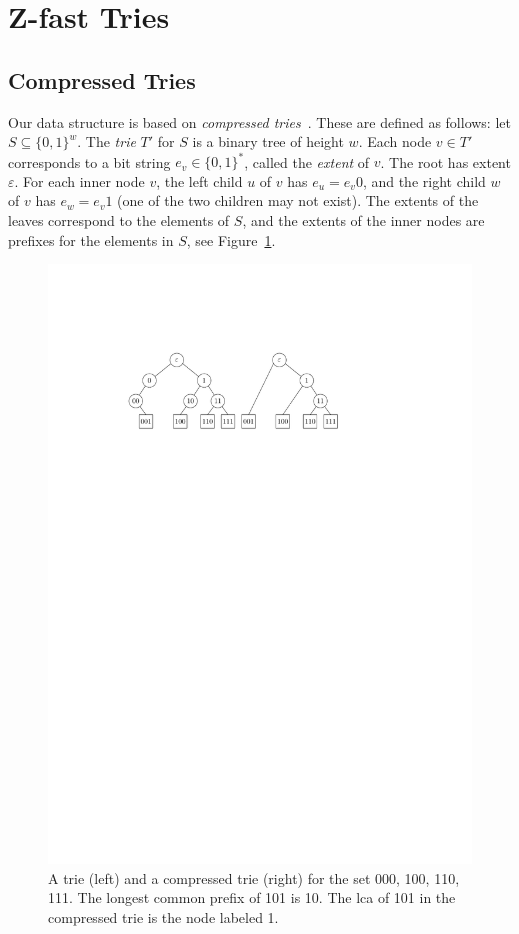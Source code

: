 \documentclass[a4paper,11pt]{article}
\newcommand{\eps}{\varepsilon}
\newcommand{\?}{\mskip1.5mu}
\begin{document}
\section{Z-fast Tries} 

\subsection{Compressed Tries}
Our data structure is based on \emph{compressed
tries}~\cite{CormenLeRiSt09,Knuth98}. These are defined as
follows: let $S \subseteq \{0, 1\}^w$. The \emph{trie} $T'$ for $S$ 
is a binary tree of height $w$. Each node $v \in T'$ corresponds
to a bit string $e_v \in \{0,1\}^*$, called the \emph{extent} of $v$. 
The root has extent $\eps$. For each inner node $v$, the left child 
$u$ of $v$  has $e_u = e_v0$, and the right child $w$ of $v$ has 
$e_w = e_v1$ (one of the two children may not exist). The extents of
the leaves correspond to the elements of $S$, and the extents of the 
inner nodes are prefixes for the elements in $S$, see 
Figure~\ref{fig:trie}.

\begin{figure}
  \centering
  \includegraphics{trie}
  \caption{A trie (left) and a compressed trie (right) for the set 
  000, 100, 110, 111. The longest common prefix of 101 is  10. The 
  lca of 101 in the compressed trie
    is the node labeled 1.}
  \label{fig:trie}
\end{figure}
\end{document}
